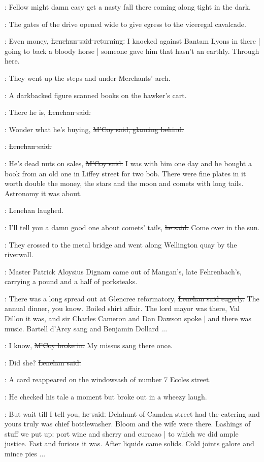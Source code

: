 \mcoy:
Fellow might damn
easy get a nasty fall there
coming along tight in the dark.

:
The gates of the drive opened wide
to give egress to the viceregal cavalcade.

\lenehan:
Even money,
\sout{Lenehan said returning.}
I knocked against Bantam Lyons in there |
going to back a bloody horse |
someone gave him that hasn't an earthly.
Through here.

:
They went up the steps and under Merchants' arch.

:
A darkbacked figure scanned books on the hawker's cart.

\lenehan:
There he is,
\sout{Lenehan said.}

\mcoy:
Wonder what he's buying,
\sout{M'Coy said,
glancing behind.}

\lenehan:
\sout{Lenehan said.}

\mcoy:
He's dead nuts on sales,
\sout{M'Coy said.}
I was with him one day
and he bought a book 
from an old one in Liffey street for two bob.
There were fine plates in it worth double the money,
the stars and the moon and comets with long tails.
Astronomy it was about.

:
Lenehan laughed.

\lenehan:
I'll tell you a damn good one about comets' tails,
\sout{he said.}
Come over in the sun.

:
They crossed to the metal bridge
and went along Wellington quay by the riverwall.

:
Master Patrick Aloysius Dignam came out of Mangan's,
late Fehrenbach's,
carrying a pound and a half of porksteaks.

\lenehan:
There was a long spread out at Glencree reformatory,
\sout{Lenehan said eagerly.}
The annual dinner, you know.
Boiled shirt affair.
The lord mayor was there,
Val Dillon it was,
and sir Charles Cameron and Dan Dawson spoke |
and there was music.
Bartell d'Arcy sang and Benjamin Dollard ...

\mcoy:
I know,
\sout{M'Coy broke in.}
My missus sang there once.

\lenehan:
Did she?
\sout{Lenehan said.}

:
A card  reappeared
on the windowsash of number 7 Eccles street.

:
He checked his tale a moment
but broke out in a wheezy laugh.

\lenehan:
But wait till I tell you,
\sout{he said.}
Delahunt of Camden street had the catering
and yours truly was chief bottlewasher.
Bloom and the wife were there.
Lashings of stuff we put up:
port wine and sherry and curacao |
to which we did ample justice.
Fast and furious it was.
After liquids came solids.
Cold joints galore and mince pies ...

